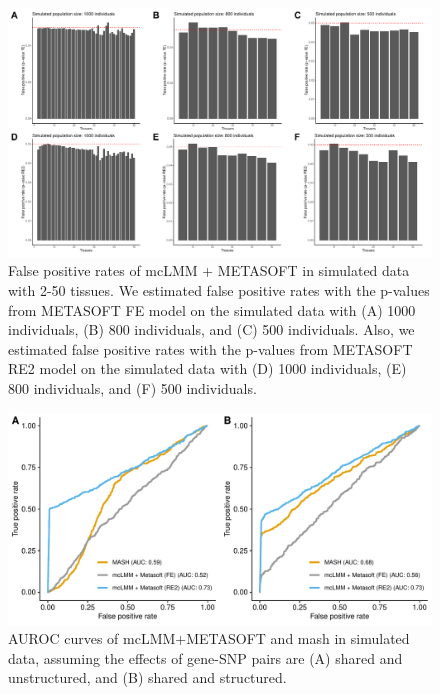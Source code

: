         \begin{figure}
            \centering
            \includegraphics[width=\textwidth]{chapter3/figures/Figure_3.pdf}
            \caption{False positive rates of mcLMM + METASOFT in simulated data with 2-50 tissues. We estimated false positive rates with the p-values from METASOFT FE model on the simulated data with (A) 1000 individuals, (B) 800 individuals, and (C) 500 individuals. Also, we estimated false positive rates with the p-values from METASOFT RE2 model on the simulated data with (D) 1000 individuals, (E) 800 individuals, and (F) 500 individuals.}
            \label{fig:fig3.3}
        \end{figure}
        
        \begin{figure}
            \centering
            \includegraphics[width=\textwidth]{chapter3/figures/Figure_4.pdf}
            \caption{AUROC curves of mcLMM+METASOFT and mash in simulated data, assuming the effects of gene-SNP pairs are (A) shared and unstructured, and (B) shared and structured.}
            \label{fig:fig3.4}
        \end{figure}

